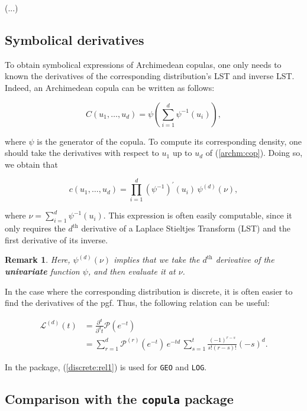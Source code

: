 \documentclass[11pt, english]{article}\usepackage[]{graphicx}\usepackage[]{color}
\newtheorem{rem}{Remark}
\begin{document}
(...)

\subsection{Symbolical derivatives}

To obtain symbolical expressions of Archimedean copulas, one only needs to known the derivatives of the corresponding distribution's LST and inverse LST. Indeed, an Archimedean copula can be written as follows:

\begin{equation}\label{archm:cop}
  C(u_1, \ldots, u_d) = \psi \left( \sum_{i = 1}^d \psi^{-1}(u_i) \right),
\end{equation}

where $\psi$ is the generator of the copula. To compute its corresponding density, one should take the  derivatives with respect to $u_1$ up to $u_d$ of (\ref{archm:cop}). Doing so, we obtain that

\begin{equation}
  c(u_1, \ldots, u_d) = \prod_{i = 1}^d \left(\psi^{-1}\right)^\prime (u_i) \, \psi^{(d)}(\nu),
\end{equation}

where $\nu = \sum_{i = 1}^d \psi^{-1}(u_i)$. This expression is often easily computable, since it only requires the $d^{\text{th}}$ derivative of a Laplace Stieltjes Transform (LST) and the first derivative of its inverse.

\begin{rem} Here, $\psi^{(d)}(\nu)$ implies that we take the $d^\text{th}$ derivative of the \textbf{univariate} function $\psi$, and then evaluate it at $\nu$.
\end{rem}

In the case where the corresponding distribution is discrete, it is often easier to find the derivatives of the pgf. Thus, the following relation can be useful:

\begin{align}\label{discrete:rel1}
  \mathcal{L}^{(d)}(t) &= \frac{\partial^d}{\partial^d t} \mathcal{P} \left(e^{-t}\right) \nonumber \\
  &= \sum_{r = 1}^d \mathcal{P}^{(r)}\left(e^{-t}\right) \, e^{-td} \, \sum_{s = 1}^t \frac{(-1)^{r - s}}{s! (r - s)!} (-s)^d.
\end{align}

In the package, (\ref{discrete:rel1}) is used for \texttt{GEO} and \texttt{LOG}. 

\subsection{Comparison with the \texttt{copula} package}
\end{document}

